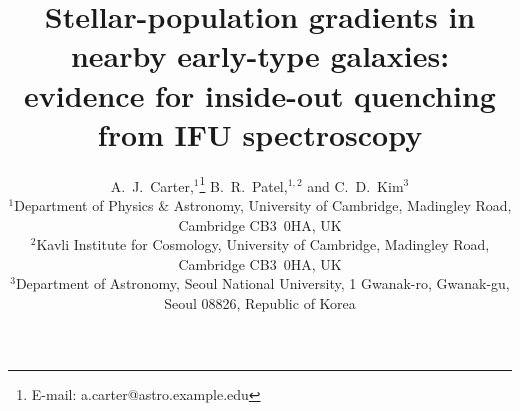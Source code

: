 %
%

\usepackage{amsmath}
\usepackage{amssymb}
\usepackage{newtxtext,newtxmath}   %
\usepackage{graphicx}
\usepackage{booktabs}
\usepackage{pgfplots}
\pgfplotsset{compat=1.18}
\usetikzlibrary{intersections}
\usepackage{microtype}
\usepackage{hyperref}

\newcommand{\Msun}{M_{\odot}}
\newcommand{\kpc}{\,\mathrm{kpc}}
\newcommand{\re}{R_{\mathrm{e}}}
\newcommand{\fe}{[\mathrm{Fe/H}]}
\newcommand{\afe}{[\alpha/\mathrm{Fe}]}
\newcommand{\logage}{\log\,\mathrm{Age}}

\title[Stellar-population gradients in ETGs]
      {Stellar-population gradients in nearby early-type galaxies:
       evidence for inside-out quenching from IFU spectroscopy}

\author[A.~J.~Carter, B.~R.~Patel \& C.~D.~Kim]{
  A.~J.~Carter,$^{1}$\thanks{E-mail: a.carter@astro.example.edu}
  B.~R.~Patel,$^{1,2}$
  and C.~D.~Kim$^{3}$
  \\
  $^{1}$Department of Physics \& Astronomy, University of Cambridge,
        Madingley Road, Cambridge CB3~0HA, UK \\
  $^{2}$Kavli Institute for Cosmology, University of Cambridge,
        Madingley Road, Cambridge CB3~0HA, UK \\
  $^{3}$Department of Astronomy, Seoul National University,
        1 Gwanak-ro, Gwanak-gu, Seoul 08826, Republic of Korea
}
